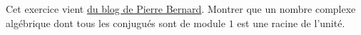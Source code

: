 
\begin{exercice}\label{exoreserve0004}

    Cet exercice vient \href{http://allken-bernard.org/pierre/weblog/?p=2061}{du blog de Pierre Bernard}. Montrer que un nombre complexe algébrique dont tous les conjugués sont de module \( 1\) est une racine de l'unité.

\end{exercice}
